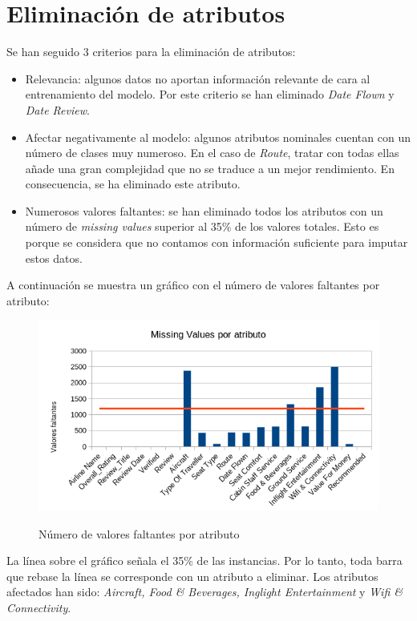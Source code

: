 \documentclass[12pt]{report} %
\begin{document}
\section{Eliminación de atributos}
\label{sec:delete_columns}
Se han seguido 3 criterios para la eliminación de atributos:
\begin{itemize}
    \item Relevancia: algunos datos no aportan información relevante de cara al entrenamiento del modelo. Por este criterio se han eliminado \textit{Date Flown} y \textit{Date Review}.
    \item Afectar negativamente al modelo: algunos atributos nominales cuentan con un número de clases muy numeroso. En el caso de \textit{Route}, tratar con todas ellas añade una gran complejidad que no se traduce a un mejor rendimiento. En consecuencia, se ha eliminado este atributo. 
    \item Numerosos valores faltantes: se han eliminado todos los atributos con un número de \textit{missing values} superior al 35\% de los valores totales. Esto es porque se considera que no contamos con información suficiente para imputar estos datos.
\end{itemize}
A continuación se muestra un gráfico con el número de valores faltantes por atributo:

\begin{figure}[H]
    \includegraphics[width=0.85\linewidth]{missings.png}\\ 
    \caption{Número de valores faltantes por atributo}
\end{figure}

La línea sobre el gráfico señala el 35\% de las instancias. Por lo tanto, toda barra que rebase la línea se corresponde con un atributo a eliminar. Los atributos afectados han sido: \textit{Aircraft, Food \& Beverages, Inglight Entertainment} y \textit{Wifi \& Connectivity}.
\end{document}
